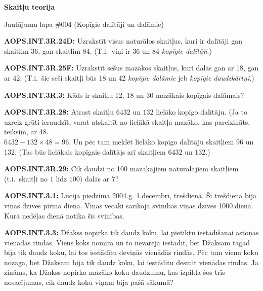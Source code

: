 \documentclass[11pt]{article}
\newenvironment{uzdevums}[1][\unskip]{%
\vspace{3mm}
\noindent
\textbf{#1:}
\noindent}
{}
\begin{document}
\begin{center}
{\LARGE \bf Skaitļu teorija}
\end{center}

\begin{center}
{\large Jautājumu lapa \#004 (Kopīgie dalītāji un dalāmie)}
\end{center}


\begin{uzdevums}[AOPS.INT.3R.24D]
Uzrakstīt visus naturālos skaitļus, kuri ir dalītāji gan skaitlim 36, gan skaitlim 84. 
(T.i.\ viņi ir 36 un 84 {\em kopīgie dalītāji}.)
\end{uzdevums}

\begin{uzdevums}[AOPS.INT.3R.25F]
Uzrakstīt sešus mazākos skaitļus, kuri dalās gan ar 18, gan ar 42. (T.i.\ šie seši skaitļi 
būs 18 un 42 {\em kopīgie dalāmie} jeb {\em kopīgie daudzkārtņi}.)
\end{uzdevums}

\begin{uzdevums}[AOPS.INT.3R.3]
Kāds ir skaitļu 12, 18 un 30 mazākais kopīgais dalāmais?
\end{uzdevums}

\begin{uzdevums}[AOPS.INT.3R.28]
Atrast skaitļu  $6432$ un $132$ lielāko kopīgo dalītāju. 
(Ja to uzreiz grūti ieraudzīt, 
varat atskaitīt no lielākā skaitļa mazāko, kas pareizināts, teiksim, ar 48. \\
$6432 - 132\times 48 = 96$. Un pēc tam meklēt lielāko kopīgo dalītāju 
skaitļiem $96$ un $132$. (Tas būs lielākais kopīgais dalītājs arī 
skaitļiem $6432$ un $132$.)
\end{uzdevums}

\begin{uzdevums}[AOPS.INT.3R.29]
Cik daudzi no 100 mazākajiem naturālajiem skaitļiem (t.i.\ skaitļi no $1$ līdz $100$)
dalās ar $7$?
\end{uzdevums}


\begin{uzdevums}[AOPS.INT.3.1]
Lūcija piedzima 2004.g. 1.decembrī, trešdienā. Šī trešdiena bija viņas dzīves pirmā diena. Viņas vecāki 
sarīkoja svinības viņas dzīves 1000.dienā. Kurā nedēļas dienā notika šīs svinības. 
\end{uzdevums}

\begin{uzdevums}[AOPS.INT.3.3]
Džakss nopirka tik daudz koku, lai pietiktu iestādīšanai astoņās vienādās rindās. 
Viens koks nomira un to nevarēja iestādīt, bet Džaksam tagad bija tik daudz koku, lai 
tos iestādītu deviņās vienādās rindās. Pēc tam vienu koku nozaga, bet Džaksam bija tik daudz 
koku, lai iestādītu desmit vienādas rindas. Ja zināms, ka Džakss nopirka mazāko koku daudzumu, 
kas izpilda šos trīs nosacījumus, cik daudz koku viņam bija pašā sākumā?
\end{uzdevums}
\end{document}

